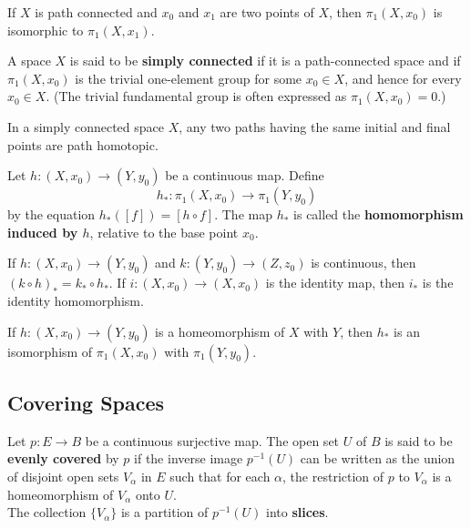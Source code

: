 \begin{corollary}
If $X$ is path connected and $x_0$ and $x_1$ are two points of $X$, then $\pi_1(X, x_0)$ is isomorphic to $\pi_1(X, x_1)$.
\end{corollary}

\begin{definition}
A space $X$ is said to be \textbf{simply connected} if it is a path-connected space and if $\pi_1(X, x_0)$ is the trivial one-element group
for some $x_0 \in X$, and hence for every $x_0 \in X$. (The trivial fundamental group is often expressed as $\pi_1(X, x_0) = 0$.)
\end{definition}


\begin{lemma}
In a simply connected space $X$, any two paths having the same initial and final points are path homotopic.
\end{lemma}

\begin{definition}
Let $h\colon (X, x_0) \rightarrow (Y, y_0)$ be a continuous map. Define 
\[
    h_{\ast} \colon \pi_1(X, x_0) \rightarrow \pi _1(Y, y_0)
\]
by the equation $h_{\ast}([f]) = [h \circ f]$. The map $h_{\ast} $ is called the \textbf{homomorphism induced by $h$}, relative to the base point $x_0$.
\end{definition}

\begin{theorem}
If $h\colon (X, x_0) \rightarrow (Y, y_0)$ and $k\colon (Y, y_0) \rightarrow (Z, z_0)$ is continuous, then $(k \circ h)_{\ast} = k_{\ast} \circ h_{\ast}$. If $i\colon (X, x_0) \rightarrow (X, x_0)$ is the identity map,
then $i_{\ast}$ is the identity homomorphism.
\end{theorem}

\begin{corollary}
If $h\colon (X, x_0) \rightarrow (Y, y_0)$ is a homeomorphism of $X$ with $Y$, then $h_{\ast} $ is an isomorphism of $\pi_1(X, x_0)$ with $\pi_1(Y, y_0)$.
\end{corollary}


\subsection{Covering Spaces}

\begin{definition}
Let $p\colon E \rightarrow B$ be a continuous surjective map. The open set $U$ of $B$ is said to be \textbf{evenly covered} by $p$ if the inverse image $p^{-1}(U)$ can be written as the
union of disjoint open sets $V_\alpha$ in $E$ such that for each $\alpha$, the restriction of $p$ to $V_\alpha$ is a homeomorphism of $V_\alpha$ onto $U$. \\

The collection $\{ V_\alpha \}$ is a partition of $p^{-1}(U)$ into \textbf{slices}.
\end{definition}

